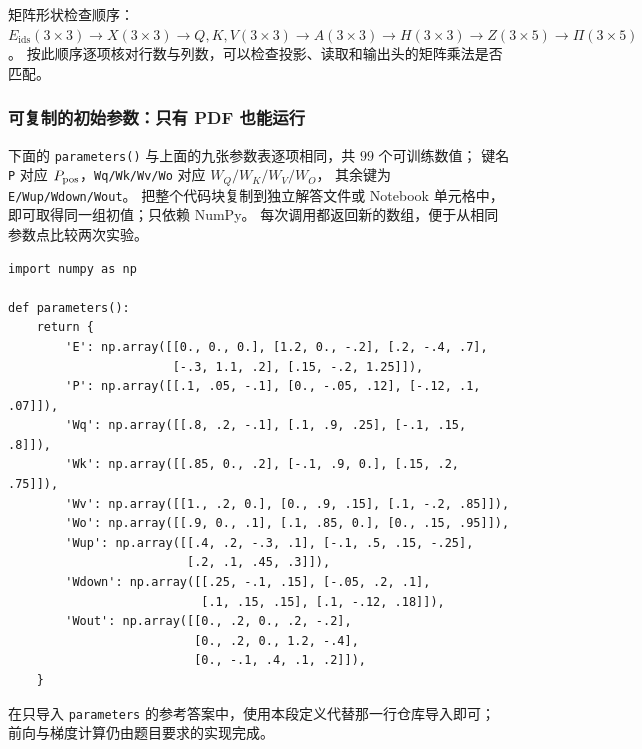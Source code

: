 \begin{idea}
矩阵形状检查顺序：
$E_{\mathrm{ids}}(3\times3)\to X(3\times3)\to
Q,K,V(3\times3)\to A(3\times3)\to H(3\times3)
\to Z(3\times5)\to\Pi(3\times5)$。
按此顺序逐项核对行数与列数，可以检查投影、读取和输出头的矩阵乘法是否匹配。
\end{idea}

\begin{samepage}
\subsubsection*{可复制的初始参数：只有 PDF 也能运行}
\label{app:parameter-literal}
下面的 \texttt{parameters()} 与上面的九张参数表逐项相同，共 $99$ 个可训练数值；
键名 \texttt{P} 对应 $P_{\rm pos}$，\texttt{Wq/Wk/Wv/Wo} 对应 $W_Q/W_K/W_V/W_O$，
其余键为 \texttt{E/Wup/Wdown/Wout}。
把整个代码块复制到独立解答文件或 Notebook 单元格中，即可取得同一组初值；只依赖 NumPy。
每次调用都返回新的数组，便于从相同参数点比较两次实验。
\par\nobreak
\begin{verbatim}
import numpy as np

def parameters():
    return {
        'E': np.array([[0., 0., 0.], [1.2, 0., -.2], [.2, -.4, .7],
                       [-.3, 1.1, .2], [.15, -.2, 1.25]]),
        'P': np.array([[.1, .05, -.1], [0., -.05, .12], [-.12, .1, .07]]),
        'Wq': np.array([[.8, .2, -.1], [.1, .9, .25], [-.1, .15, .8]]),
        'Wk': np.array([[.85, 0., .2], [-.1, .9, 0.], [.15, .2, .75]]),
        'Wv': np.array([[1., .2, 0.], [0., .9, .15], [.1, -.2, .85]]),
        'Wo': np.array([[.9, 0., .1], [.1, .85, 0.], [0., .15, .95]]),
        'Wup': np.array([[.4, .2, -.3, .1], [-.1, .5, .15, -.25],
                         [.2, .1, .45, .3]]),
        'Wdown': np.array([[.25, -.1, .15], [-.05, .2, .1],
                           [.1, .15, .15], [.1, -.12, .18]]),
        'Wout': np.array([[0., .2, 0., .2, -.2],
                          [0., .2, 0., 1.2, -.4],
                          [0., -.1, .4, .1, .2]]),
    }
\end{verbatim}
在只导入 \texttt{parameters} 的参考答案中，使用本段定义代替那一行仓库导入即可；
前向与梯度计算仍由题目要求的实现完成。
\end{samepage}
